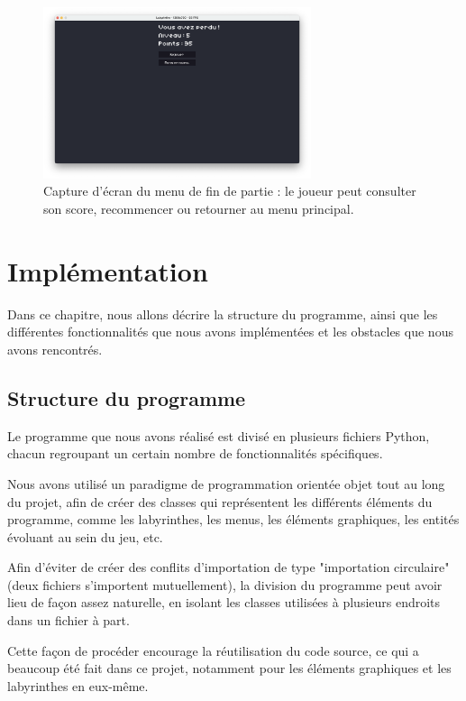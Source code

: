 \documentclass[12pt]{scrreprt} %
\begin{document}
\begin{figure}[h]
    \centering
    \includegraphics[width=0.7\textwidth]{images/loosemenu.png}
    \caption{Capture d'écran du menu de fin de partie : le joueur peut consulter son score, recommencer ou retourner au menu principal.}
\end{figure}

\chapter{Implémentation}

Dans ce chapitre, nous allons décrire la structure du programme, ainsi que les différentes fonctionnalités que nous avons implémentées et les obstacles que nous avons rencontrés.

\section{Structure du programme}

Le programme que nous avons réalisé est divisé en plusieurs fichiers Python, chacun regroupant un certain nombre de fonctionnalités spécifiques.

Nous avons utilisé un paradigme de programmation orientée objet tout au long du projet, afin de créer des classes qui représentent les différents éléments du programme, comme les labyrinthes, les menus, les éléments graphiques, les entités évoluant au sein du jeu, etc.

Afin d'éviter de créer des conflits d'importation de type "importation circulaire" (deux fichiers s'importent mutuellement), la division du programme peut avoir lieu de façon assez naturelle, en isolant les classes utilisées à plusieurs endroits dans un fichier à part.

Cette façon de procéder encourage la réutilisation du code source, ce qui a beaucoup été fait dans ce projet, notamment pour les éléments graphiques et les labyrinthes en eux-même.
\end{document}
